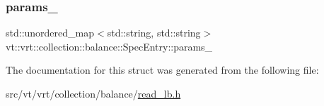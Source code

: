 \subsubsection{\texorpdfstring{params\+\_\+}{params\_}}
{\footnotesize\ttfamily std\+::unordered\+\_\+map$<$std\+::string, std\+::string$>$ vt\+::vrt\+::collection\+::balance\+::\+Spec\+Entry\+::params\+\_\+\hspace{0.3cm}{\ttfamily [private]}}



The documentation for this struct was generated from the following file\+:\begin{DoxyCompactItemize}
\item 
src/vt/vrt/collection/balance/\hyperlink{read__lb_8h}{read\+\_\+lb.\+h}\end{DoxyCompactItemize}
